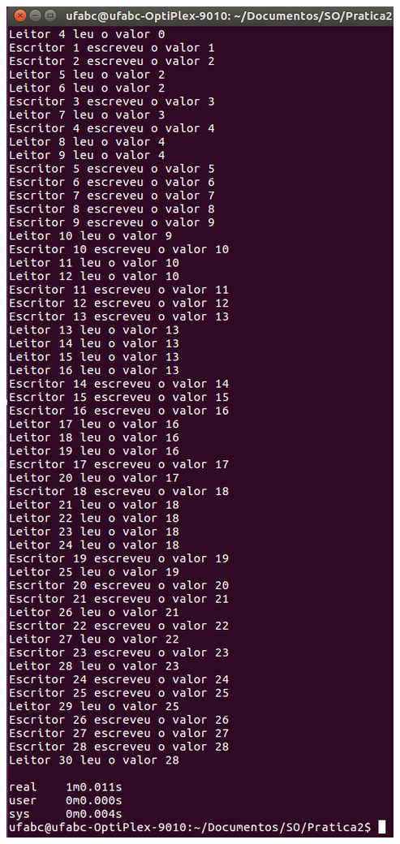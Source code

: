 \begin{minipage}{\textwidth}
    \includegraphics[trim=0 0 0 0,clip,scale=.4]{pratica2/time-prog6.png}
    \label{prog4modpng}
    \hspace{1em}
\end{minipage}


